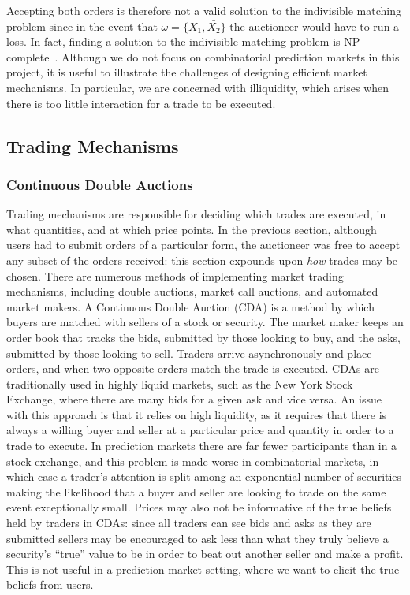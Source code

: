 Accepting both orders is therefore not a valid solution to the indivisible
matching problem since in the event that $\omega = \{X_1,\bar{X_2}\}$ the
auctioneer would have to run a loss. In fact, finding a solution to the
indivisible matching problem is NP-complete~\cite[Ch.~26]{AGTBook}. Although we
do not focus on combinatorial prediction markets in this project, it is useful
to illustrate the challenges of designing efficient market mechanisms. In
particular, we are concerned with illiquidity, which arises when there is too
little interaction for a trade to be executed.

\subsection{Trading Mechanisms}

\label{sec:tradingMechanisms}

\subsubsection{Continuous Double Auctions}

Trading mechanisms are responsible for deciding which trades are executed, in
what quantities, and at which price points. In the previous section, although
users had to submit orders of a particular form, the auctioneer was free to
accept any subset of the orders received: this section expounds upon \emph{how}
trades may be chosen. There are numerous methods of implementing market trading
mechanisms, including double auctions, market call auctions, and automated
market makers. A Continuous Double Auction (CDA) is a method by which buyers
are matched with sellers of a stock or security. The market maker keeps an
order book that tracks the bids, submitted by those looking to buy, and the
asks, submitted by those looking to sell. Traders arrive asynchronously and
place orders, and when two opposite orders match the trade is executed. CDAs
are traditionally used in highly liquid markets, such as the New York Stock
Exchange, where there are many bids for a given ask and vice versa. An issue
with this approach is that it relies on high liquidity, as it requires that
there is always a willing buyer and seller at a particular price and quantity
in order to a trade to execute. In prediction markets there are far fewer
participants than in a stock exchange, and this problem is made worse in
combinatorial markets, in which case a trader's attention is split among an
exponential number of securities making the likelihood that a buyer and seller
are looking to trade on the same event exceptionally small. Prices may also not
be informative of the true beliefs held by traders in CDAs: since all traders
can see bids and asks as they are submitted sellers may be encouraged to ask
less than what they truly believe a security's ``true'' value to be in order to
beat out another seller and make a profit. This is not useful in a prediction
market setting, where we want to elicit the true beliefs from users.


